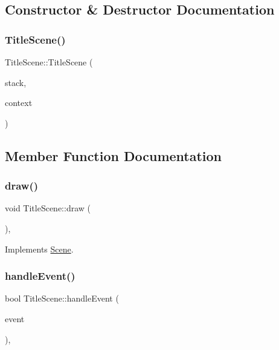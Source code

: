 \subsection{Constructor \& Destructor Documentation}
\mbox{\label{class_title_scene_a280a3b1e5890f45b932860777f8fbe6d}} 
\subsubsection{\texorpdfstring{Title\+Scene()}{TitleScene()}}
{\footnotesize\ttfamily Title\+Scene\+::\+Title\+Scene (\begin{DoxyParamCaption}\item[{\hyperlink{class_scene_stack}{Scene\+Stack} \&}]{stack,  }\item[{\hyperlink{struct_scene_1_1_context}{Context}}]{context }\end{DoxyParamCaption})}



\subsection{Member Function Documentation}
\mbox{\label{class_title_scene_a3e527255771f75a41c4fe8aaa35999dd}} 
\subsubsection{\texorpdfstring{draw()}{draw()}}
{\footnotesize\ttfamily void Title\+Scene\+::draw (\begin{DoxyParamCaption}{ }\end{DoxyParamCaption})\hspace{0.3cm}{\ttfamily [override]}, {\ttfamily [virtual]}}



Implements \hyperlink{class_scene_a789c16961aa1e316b2a4a05b95187546}{Scene}.

\mbox{\label{class_title_scene_a1f019a83309ce967883b4b4d76b816af}} 
\subsubsection{\texorpdfstring{handle\+Event()}{handleEvent()}}
{\footnotesize\ttfamily bool Title\+Scene\+::handle\+Event (\begin{DoxyParamCaption}\item[{const sf\+::\+Event \&}]{event }\end{DoxyParamCaption})\hspace{0.3cm}{\ttfamily [override]}, {\ttfamily [virtual]}}



